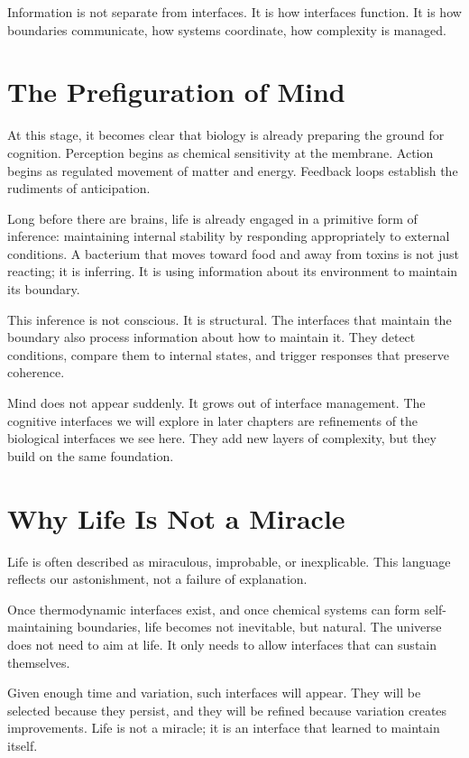 \documentclass[
  openright]{book}
\begin{document}
Information is not separate from interfaces. It is how interfaces
function. It is how boundaries communicate, how systems coordinate, how
complexity is managed.

\section{The Prefiguration of Mind}\label{the-prefiguration-of-mind}

At this stage, it becomes clear that biology is already preparing the
ground for cognition. Perception begins as chemical sensitivity at the
membrane. Action begins as regulated movement of matter and energy.
Feedback loops establish the rudiments of anticipation.

Long before there are brains, life is already engaged in a primitive
form of inference: maintaining internal stability by responding
appropriately to external conditions. A bacterium that moves toward food
and away from toxins is not just reacting; it is inferring. It is using
information about its environment to maintain its boundary.

This inference is not conscious. It is structural. The interfaces that
maintain the boundary also process information about how to maintain it.
They detect conditions, compare them to internal states, and trigger
responses that preserve coherence.

Mind does not appear suddenly. It grows out of interface management. The
cognitive interfaces we will explore in later chapters are refinements
of the biological interfaces we see here. They add new layers of
complexity, but they build on the same foundation.

\section{Why Life Is Not a Miracle}\label{why-life-is-not-a-miracle}

Life is often described as miraculous, improbable, or inexplicable. This
language reflects our astonishment, not a failure of explanation.

Once thermodynamic interfaces exist, and once chemical systems can form
self-maintaining boundaries, life becomes not inevitable, but natural.
The universe does not need to aim at life. It only needs to allow
interfaces that can sustain themselves.

Given enough time and variation, such interfaces will appear. They will
be selected because they persist, and they will be refined because
variation creates improvements. Life is not a miracle; it is an
interface that learned to maintain itself.
\end{document}
